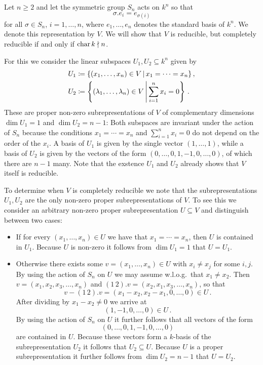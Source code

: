 \begin{example}
  \label{example: subrepresentations of natural action of Sn}
  Let $n \geq 2$ and let the symmetric group $S_n$ acts on $k^n$ so that
  \[
    \sigma.e_i = e_{\sigma(i)}
  \]
  for all $\sigma \in S_n$, $i = 1, \dotsc, n$, where $e_1, \dotsc, e_n$ denotes the standard basis of $k^n$.
  We denote this representation by $V$.
  We will show that $V$ is reducible, but completely reducible if and only if $\operatorname{char} k \nmid n$.

  For this we consider the linear subspaces $U_1, U_2 \subseteq k^n$ given by
  \begin{align*}
              U_1
    &\defined \{
                (x_1, \dotsc, x_n) \in V
              \suchthat
                x_1 = \dotsb = x_n
              \} \,,
    \\
              U_2
    &\defined \left\{
                (\lambda_1, \dotsc, \lambda_n) \in V
              \suchthat*
                \sum_{i=1}^n x_i = 0
              \right\} \,.
  \end{align*}
  These are proper non-zero subrepresentations of $V$ of complementary dimensions $\dim U_1 = 1$ and $\dim U_2 = n - 1$:
  Both subspaces are invariant under the action of $S_n$ because the conditions $x_1 = \dotsb = x_n$ and $\sum_{i=1}^n x_i = 0$ do not depend on the order of the $x_i$.
  A basis of $U_1$ is given by the single vector $(1, \dotsc, 1)$, while a basis of $U_2$ is given by the vectors of the form $(0, \dotsc, 0, 1, -1, 0, \dotsc, 0)$, of which there are $n-1$ many.
  Note that the exstence $U_1$ and $U_2$ already shows that $V$ itself is reducible.
  
  To determine when $V$ is completely reducible we note that the subrepresentations $U_1, U_2$ are the only non-zero proper subrepresentations of $V$.
  To see this we consider an arbitrary non-zero proper subrepresentation $U \subseteq V$ and distinguish between two cases:
  \begin{itemize}
    \item
      If for every $(x_1, \dotsc, x_n) \in U$ we have that $x_1 = \dotsb  = x_n$, then $U$ is contained in $U_1$.
      Because $U$ is non-zero it follows from $\dim U_1 = 1$ that $U = U_1$.
    \item
      Otherwise there exists some $v = (x_1, \dotsc, x_n) \in U$ with $x_i \neq x_j$ for some $i,j$.
      By using the action of $S_n$ on $U$ we may assume w.l.o.g.\ that $x_1 \neq x_2$.
      Then $v = (x_1, x_2, x_3, \dotsc, x_n)$ and $(1\,2).v = (x_2, x_1, x_3, \dotsc, x_n)$, so that
      \[
            v - (1\,2).v
        =   (x_1 - x_2, x_2 - x_1, 0, \dotsc, 0)
        \in U \,.
      \]
      After dividing by $x_1 - x_2 \neq 0$ we arrive at
      \[
            (1, -1, 0, \dotsc, 0)
        \in U \,.
      \]
      By using the action of $S_n$ on $U$ it further follows that all vectors of the form
      \[
        (0, \dotsc, 0, 1, -1, 0, \dotsc, 0)
      \]
      are contained in $U$.
      Because these vectors form a $k$-basis of the subrepresentation $U_2$ it follows that $U_2 \subseteq U$.
      Because $U$ is a proper subrepresentation it further follows from $\dim U_2 = n-1$ that $U = U_2$.
  \end{itemize}
  

\end{example}
